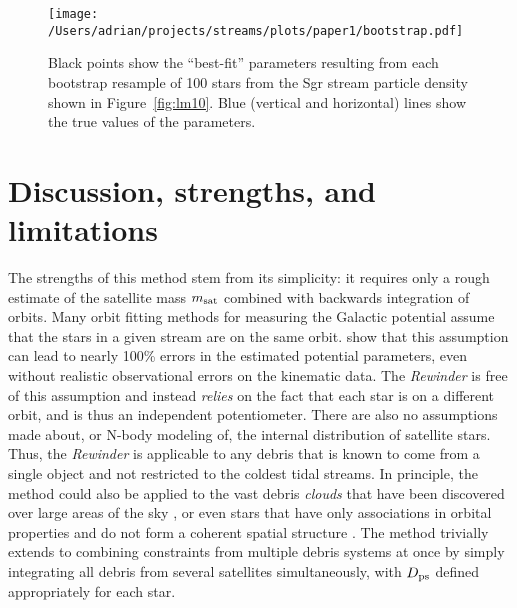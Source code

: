 \documentclass{emulateapj}
\begin{document}
\begin{figure}[h]
\begin{center}
\texttt{[image: /Users/adrian/projects/streams/plots/paper1/bootstrap.pdf]}
\caption{ Black points show the ``best-fit'' parameters resulting from each bootstrap resample of 100 stars from the Sgr stream particle density shown in Figure~\ref{fig:lm10}. Blue (vertical and horizontal) lines show the true values of the parameters. }\label{fig:bootstrap}
\end{center}
\end{figure}


\section{Discussion, strengths, and limitations}
\label{sec:discussion}

The strengths of this method stem from its simplicity: it requires
only a rough estimate of the satellite mass $m_{\rm sat}$ combined
with backwards integration of orbits. Many orbit fitting methods for measuring the Galactic potential assume
that the stars in a given stream are on the same
orbit. \cite{sanders13a} show that this assumption can lead to nearly
100\% errors in the estimated potential parameters, even without
realistic observational errors on the kinematic data. The
\emph{Rewinder} is free of this assumption and instead \emph{relies}
on the fact that each star is on a different orbit, and is thus an
independent potentiometer. There are also no assumptions made
about, or N-body modeling of, the internal distribution of satellite
stars. Thus, the \emph{Rewinder} is applicable to any debris that is
known to come from a single object and not restricted to the coldest
tidal streams. In principle, the method could also be applied to the
vast debris {\it clouds} that have been discovered over large areas of
the sky \citep[e.g. the Triangulum Andromeda and Hercules-Aquila
  clouds]{rochapinto04,belokurov06}, or even stars that have only
associations in orbital properties and do not form a coherent spatial
structure \citep[such as the angular momentum groupings in local
  giants found by][]{helmi99}. The method trivially extends to
combining constraints from multiple debris systems at once by simply
integrating all debris from several satellites simultaneously, with
$D_{\rm ps}$ defined appropriately for each star.
\end{document}
